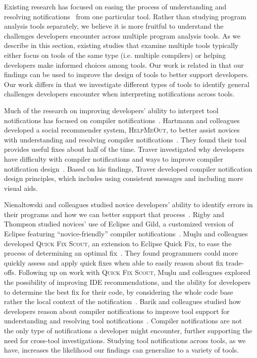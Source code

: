 \documentclass{llncs}
\begin{document}
Existing research has focused on easing the process of understanding and resolving notifications~\cite{Hartmann:2010:Suggestions,Mucslu:2012:Speculative,pham2015automatically,fritz2014developers} from one particular tool.
Rather than studying program analysis tools separately, we believe it is more fruitful to understand the challenges developers encounter across multiple program analysis tools.
As we describe in this section,
existing studies that examine multiple tools typically either focus on tools of the same type (i.e. multiple compilers) 
or helping developers make informed choices among tools. 
Our work is related in that our findings can be used to improve the design of tools to better support developers.
Our work differs in that we investigate different types of tools to identify general challenges developers encounter when interpreting notifications across tools. 

Much of the research on improving developers' ability to interpret tool notifications has focused on compiler notifications~\cite{Hartmann:2010:Suggestions,Traver:2010:Messages,barik14}. 
Hartmann and colleagues developed a social recommender system, \textsc{HelpMeOut}, to better assist novices with understanding and resolving compiler notifications~\cite{Hartmann:2010:Suggestions}. They found their tool provides useful fixes about half of the time. Traver investigated why developers have difficulty with compiler notifications and ways to improve compiler notification design~\cite{Traver:2010:Messages}. Based on his findings, Traver developed compiler notification design principles, which includes using consistent messages and including more visual aids.

Nienaltowski and colleagues studied novice developers' ability to identify errors in their programs and how we can better support that process~\cite{Nienaltowski:2008:Compiler}.
Rigby and Thompson studied novices' use of Eclipse and Gild, a customized version of Eclipse featuring ``novice-friendly'' compiler notifications~\cite{Rigby:2005:Novice}.
Mu\c{s}lu and colleagues developed \textsc{Quick Fix Scout}, an extension to Eclipse Quick Fix, to ease the process of determining an
optimal fix~\cite{Mucslu:2012:Speculative}. They found programmers could more quickly assess and apply quick fixes when able to easily reason about fix trade-offs.
Following up on work with \textsc{Quick Fix Scout}, Mu\c{s}lu and colleagues explored the possibility of improving IDE recommendations, and the ability for developers to determine the best fix for their code, by considering the whole code base rather the local context of the notification~\cite{mucslu2012improving}.
Barik and colleagues studied how developers reason about compiler notifications to improve tool support for understanding and resolving tool notifications~\cite{barik14}.
Compiler notifications are not the only type of notifications a developer might encounter, further supporting the need for cross-tool investigations.
Studying tool notifications across tools, as we have, increases the likelihood our findings can generalize to a variety of tools.
\end{document}
